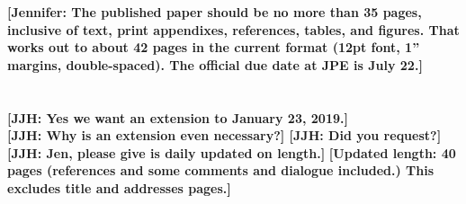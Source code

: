 \begin{titlepage}
\author{
Jorge Luis Garc\'{i}a\\
Department of Economics\\
The University of Chicago \and
James J. Heckman \\
American Bar Foundation \\
Department of Economics\\
The University of Chicago \and
Duncan Ermini Leaf \\
Leonard D. Schaeffer Center \\  for Health Policy and Economics\\
University of Southern California \and
Mar\'{i}a Jos\'{e} Prados \\
Dornsife Center for \\ Economic and Social Research\\
University of Southern California}
\date{First Draft: January 5, 2016\\ This Draft: \today}

\maketitle
\thispagestyle{empty}
\restoregeometry
\end{titlepage}

\singlespacing
\thispagestyle{empty}

\noindent \textbf{[Jennifer: The published paper should be no more than 35 pages, inclusive of text, print appendixes, references, tables, and figures. That works out to about 42 pages in the current format (12pt font, 1'' margins, double-spaced). The official due date at JPE is July 22.]\\ 
\\ 
}\\ 
\noindent \textbf{[JJH: Yes we want an extension to January 23, 2019.]} \\
\noindent \textbf{[JJH: Why is an extension even necessary?] [JJH: Did you request?]} \\

\bigskip 
\noindent \textbf{[JJH: Jen, please give is daily updated on length.]}
\noindent \textbf{[Updated length: 40 pages (references and some comments and dialogue included.) This excludes title and addresses pages.]}

